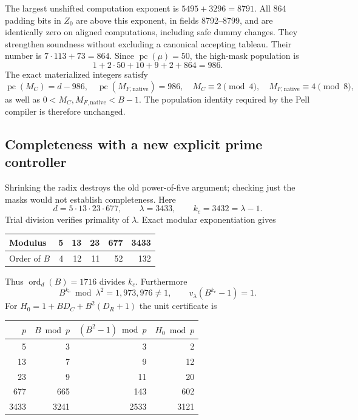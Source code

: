 \documentclass[11pt]{article}
\newcommand{\pc}{\operatorname{pc}}
\begin{document}
The largest unshifted computation exponent is $5495+3296=8791$.
All 864 padding bits in $Z_0$ are above this exponent, in fields 8792--8799,
and are identically zero on aligned computations, including safe dummy
changes. They strengthen soundness without excluding a canonical accepting
tableau. Their number is $7\cdot113+73=864$. Since $\pc(\mu)=50$, the
high-mask population is
\[
 1+2\cdot50+10+9+2+864=986.
\]
The exact materialized integers satisfy
\[
 \pc(M_C)=d-986,\quad \pc(M_{F,\mathrm{native}})=986,
 \quad M_C\equiv2\pmod4,\quad M_{F,\mathrm{native}}\equiv4\pmod8,
\]
as well as $0<M_C,M_{F,\mathrm{native}}<B-1$. The population identity
required by the Pell compiler is therefore unchanged.

\subsection{Completeness with a new explicit prime controller}

Shrinking the radix destroys the old power-of-five argument; checking just
the masks would not establish completeness. Here
\[
 d=5\cdot13\cdot23\cdot677,
 \qquad \lambda=3433,\qquad k_c=3432=\lambda-1.
\]
Trial division verifies primality of $\lambda$. Exact modular exponentiation
gives
\begin{center}
\begin{tabular}{@{}lrrrrr@{}}
\toprule
Modulus & 5 & 13 & 23 & 677 & 3433\\
\midrule
Order of $B$ & 4 & 12 & 11 & 52 & 132\\
\bottomrule
\end{tabular}
\end{center}
Thus $\operatorname{ord}_{d}(B)=1716$ divides $k_c$. Furthermore
\[
 B^{k_c}\bmod\lambda^2=1,973,976\ne1,
 \qquad v_\lambda(B^{k_c}-1)=1.
\]
For $H_0=1+BD_C+B^2(D_R+1)$ the unit certificate is
\begin{center}
\begin{tabular}{@{}rrrr@{}}
\toprule
$p$ & $B\bmod p$ & $(B^2-1)\bmod p$ & $H_0\bmod p$\\
\midrule
5 & 3 & 3 & 2\\
13 & 7 & 9 & 12\\
23 & 9 & 11 & 20\\
677 & 665 & 143 & 602\\
3433 & 3241 & 2533 & 3121\\
\bottomrule
\end{tabular}
\end{center}
\end{document}
